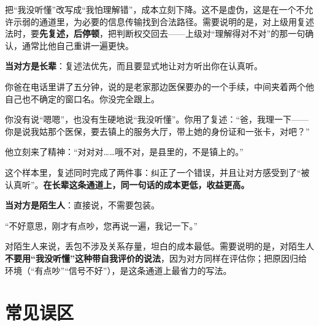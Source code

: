 把“我没听懂”改写成“我怕理解错”，成本立刻下降。这不是虚伪，这是在一个不允许示弱的通道里，为必要的信息传输找到合法路径。需要说明的是，对上级用复述法时，要\textbf{先复述，后停顿}，把判断权交回去——上级对“理解得对不对”的那一句确认，通常比他自己重讲一遍更快。

\textbf{当对方是长辈}：复述法优先，而且要显式地让对方听出你在认真听。

\par
\begin{mdquote}
你爸在电话里讲了五分钟，说的是老家那边医保要办的一个手续，中间夹着两个他自己也不确定的窗口名。你没完全跟上。

你没有说“嗯嗯”，也没有生硬地说“我没听懂”。你用了复述：“爸，我理一下——你是说我姑那个医保，要去镇上的服务大厅，带上她的身份证和一张卡，对吧？”

他立刻来了精神：“对对对……哦不对，是县里的，不是镇上的。”
\end{mdquote}

这个样本里，复述同时完成了两件事：纠正了一个错误，并且让对方感受到了“被认真听”。\textbf{在长辈这条通道上，同一句话的成本更低，收益更高。}

\textbf{当对方是陌生人}：直接说，不需要包装。

\begin{mdquote}
“不好意思，刚才有点吵，您再说一遍，我记一下。”
\end{mdquote}

对陌生人来说，丢包不涉及关系存量，坦白的成本最低。需要说明的是，对陌生人\textbf{不要用“我没听懂”这种带自我评价的说法}，因为对方同样在评估你；把原因归给环境（“有点吵”“信号不好”），是这条通道上最省力的写法。

\section[常见误区]{常见误区}





